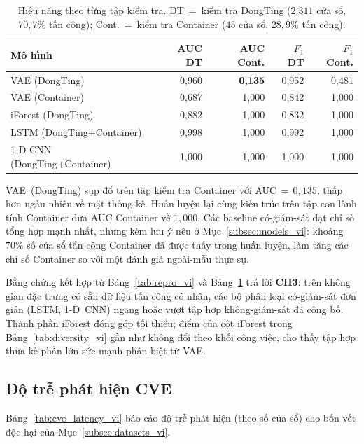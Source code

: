 \begin{table}[!t]
\centering
\caption{Hiệu năng theo từng tập kiểm tra. DT~=~kiểm tra DongTing
($2.311$ cửa sổ, $70{,}7\%$ tấn công); Cont.~=~kiểm tra Container
($45$ cửa sổ, $28{,}9\%$ tấn công).}
\label{tab:v2_models_vi}
\begin{tabular}{lrrrr}
\toprule
Mô hình                           & AUC DT & AUC Cont. & $F_{1}$ DT & $F_{1}$ Cont. \\
\midrule
VAE (DongTing)                    & 0,960  & \textbf{0,135} & 0,952 & 0,481 \\
VAE (Container)                   & 0,687  & 1,000          & 0,842 & 1,000 \\
iForest (DongTing)                & 0,882  & 1,000          & 0,832 & 1,000 \\
LSTM (DongTing+Container)         & 0,998  & 1,000          & 0,992 & 1,000 \\
1-D CNN (DongTing+Container)      & 1,000  & 1,000          & 1,000 & 1,000 \\
\bottomrule
\end{tabular}
\end{table}

VAE~(DongTing) sụp đổ trên tập kiểm tra Container với AUC$\,=\,0{,}135$,
thấp hơn ngẫu nhiên về mặt thống kê. Huấn luyện lại cùng kiến trúc
trên tập con lành tính Container đưa AUC Container về $1{,}000$. Các
baseline có-giám-sát đạt chỉ số tổng hợp mạnh nhất, nhưng kèm lưu ý
nêu ở Mục~\ref{subsec:models_vi}: khoảng $70\%$ số cửa sổ tấn công
Container đã được thấy trong huấn luyện, làm tăng các chỉ số Container
so với một đánh giá ngoài-mẫu thực sự.

Bằng chứng kết hợp từ Bảng~\ref{tab:repro_vi} và
Bảng~\ref{tab:v2_models_vi} trả lời \textbf{CH3}: trên không gian
đặc trưng có sẵn dữ liệu tấn công có nhãn, các bộ phân loại có-giám-sát
đơn giản (LSTM, 1-D~CNN) ngang hoặc vượt tập hợp không-giám-sát đã
công bố. Thành phần iForest đóng góp tối thiểu; điểm của cột iForest
trong Bảng~\ref{tab:diversity_vi} gần như không đổi theo khối công
việc, cho thấy tập hợp thừa kế phần lớn sức mạnh phân biệt từ VAE.

\subsection{Độ trễ phát hiện CVE}
\label{subsec:cve_latency_vi}
Bảng~\ref{tab:cve_latency_vi} báo cáo độ trễ phát hiện (theo số cửa
sổ) cho bốn vết độc hại của Mục~\ref{subsec:datasets_vi}.

